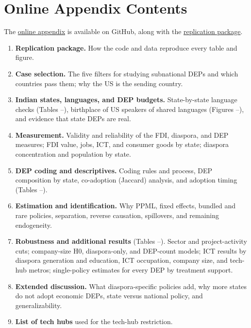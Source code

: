 \documentclass[12pt]{article}
\begin{document}
\newpage
\printbibliography

\newpage
\section*{Online Appendix Contents}

\noindent The \href{\appendixurl}{online appendix} is available on GitHub, along with the \href{\repourl}{replication package}.

\begin{enumerate}[label=\arabic*., leftmargin=*, itemsep=4pt]
    \item \textbf{Replication package.} How the code and data reproduce every table and figure.
    \item \textbf{Case selection.} The five filters for studying subnational DEPs and which countries pass them; why the US is the sending country.
    \item \textbf{Indian states, languages, and DEP budgets.} State-by-state language checks (Tables --), birthplace of US speakers of shared languages (Figures --), and evidence that state DEPs are real.
    \item \textbf{Measurement.} Validity and reliability of the FDI, diaspora, and DEP measures; FDI value, jobs, ICT, and consumer goods by state; diaspora concentration and population by state.
    \item \textbf{DEP coding and descriptives.} Coding rules and process, DEP composition by state, co-adoption (Jaccard) analysis, and adoption timing (Tables --).
    \item \textbf{Estimation and identification.} Why PPML, fixed effects, bundled and rare policies, separation, reverse causation, spillovers, and remaining endogeneity.
    \item \textbf{Robustness and additional results} (Tables --). Sector and project-activity cuts; company-size H0, diaspora-only, and DEP-count models; ICT results by diaspora generation and education, ICT occupation, company size, and tech-hub metros; single-policy estimates for every DEP by treatment support.
    \item \textbf{Extended discussion.} What diaspora-specific policies add, why more states do not adopt economic DEPs, state versus national policy, and generalizability.
    \item \textbf{List of tech hubs} used for the tech-hub restriction.
\end{enumerate}
\end{document}
